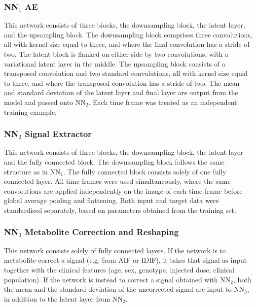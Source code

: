         \subsubsection{\gls{NN}$_1$ \gls{AE}} \label{sec:NN1}
            This network consists of three blocks, the downsampling block, the latent layer, and the upsampling block. The downsampling block comprises three convolutions, all with kernel size equal to three, and where the final convolution has a stride of two. The latent block is flanked on either side by two convolutions, with a variational latent layer in the middle. The upsampling block consists of a transposed convolution and two standard convolutions, all with kernel size equal to three, and where the transposed convolution has a stride of two. The mean and standard deviation of the latent layer and final layer are output from the model and passed onto \gls{NN}$_2$.
            Each time frame was treated as an independent training example.


        \subsubsection{\gls{NN}$_2$ Signal Extractor} \label{sec:NN2}
            This network consists of three blocks, the downsampling block, the latent layer and the fully connected block. The downsampling block follows the same structure as in \gls{NN}$_1$. The fully connected block consists solely of one fully connected layer. All time frames were used simultaneously, where the same convolutions are applied independently on the image of each time frame before global average pooling and flattening. Both input and target data were standardised separately, based on parameters obtained from the training set. 
        \subsubsection{\gls{NN}$_3$ Metabolite Correction and Reshaping} \label{sec:NN3}
            This network consists solely of fully connected layers. If the network is to metabolite-correct a signal (e.g. from \gls{AIF} or \gls{IDIF}), it takes that signal as input together with the clinical features (age, sex, genotype, injected dose, clinical population).  If the network is instead to correct a signal obtained with \gls{NN}$_2$, both the mean and the standard deviation of the uncorrected signal are input to \gls{NN}$_3$, in addition to the latent layer from \gls{NN}$_2$. %

